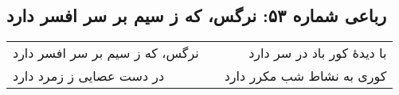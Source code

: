 \begin{center}
\section*{رباعی شماره ۵۳: نرگس، که ز سیم بر سر افسر دارد}
\label{sec:053}
\begin{longtable}{l p{0.5cm} r}
نرگس، که ز سیم بر سر افسر دارد
&&
با دیدهٔ کور باد در سر دارد
\\
در دست عصایی ز زمرد دارد
&&
کوری به نشاط شب مکرر دارد
\\
\end{longtable}
\end{center}
